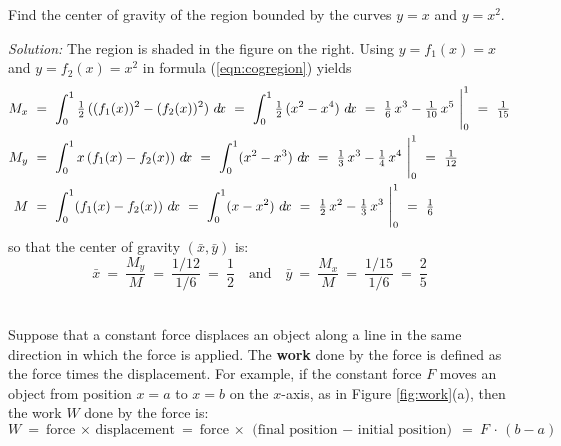 \begin{exmp}\label{exmp:cogregion2}
\noindent Find the center of gravity of the region bounded by the curves $y=x$
and $y=x^2$.\vspace{1mm}
\par\noindent\emph{Solution:} The region is shaded in the figure on the right.
Using $y=f_1(x)=x$ and $y=f_2(x)=x^2$ in formula (\ref{eqn:cogregion}) yields
\begin{align*}
M_x ~&=~ \int_0^1 \tfrac{1}{2}\,((f_1(x))^2-(f_2(x))^2)~d\!x ~=~
         \int_0^1 \tfrac{1}{2}\,(x^2-x^4)~d\!x ~=~
         \tfrac{1}{6}\,x^3 - \tfrac{1}{10}\,x^5~\Biggr|_0^1 ~=~ \tfrac{1}{15}\\
M_y ~&=~ \int_0^1 x\,(f_1(x)-f_2(x))~d\!x ~=~ \int_0^1 (x^2 - x^3)~d\!x ~=~
         \tfrac{1}{3}\,x^3 - \tfrac{1}{4}\,x^4~\Biggr|_0^1 ~=~
         \tfrac{1}{12}\\
M ~&=~ \int_0^1 (f_1(x) - f_2(x))~d\!x ~=~ \int_0^1 (x-x^2)~d\!x ~=~
       \tfrac{1}{2}\,x^2 - \tfrac{1}{3}\,x^3~\Biggr|_0^1 ~=~ \tfrac{1}{6}
\end{align*}
so that the center of gravity $(\bar{x},\bar{y})$ is:
\[
\bar{x} ~=~ \frac{M_y}{M} ~=~ \frac{1/12}{1/6} ~=~ \frac{1}{2}
\quad\text{and}\quad
\bar{y} ~=~ \frac{M_x}{M} ~=~ \frac{1/15}{1/6} ~=~ \frac{2}{5}
\]
\end{exmp}
\divider
\newpage
{}\\

Suppose that a constant force displaces an object along a line in the same
direction in which the force is applied. The \textbf{work} done by the force is
defined as the force times the displacement. For example, if the constant force
$F$ moves an object from position $x=a$ to $x=b$ on the $x$-axis, as in Figure
\ref{fig:work}(a), then the work $W$ done by the force is:
\[
W ~=~ \text{force}\,\times\,\text{displacement} ~=~
\text{force}\,\times\,\text{(final position $-$ initial position)} ~=~
F\,\cdot\,(b-a)
\]

